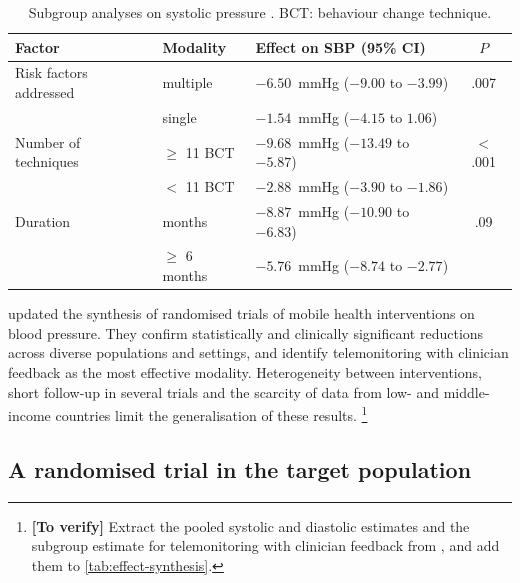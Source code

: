 \documentclass[12pt,a4paper,oneside]{report}
\newcommand{\verify}[1]{\footnote{\textbf{[To verify]} #1}}
\begin{document}
\begin{table}[htbp]
\centering\small
\caption{Subgroup analyses on systolic pressure \parencite{zhou2024}. BCT: behaviour change technique.}\label{tab:subgroups}
\begin{tabularx}{\textwidth}{@{}>{\raggedright\arraybackslash}p{3.3cm} >{\raggedright\arraybackslash}p{2.5cm} X c@{}}
\toprule
\textbf{Factor} & \textbf{Modality} & \textbf{Effect on SBP (95\% CI)} & \textbf{$P$} \\
\midrule
Risk factors addressed & multiple & $-6.50$~mmHg ($-9.00$ to $-3.99$) & .007 \\
                       & single   & $-1.54$~mmHg ($-4.15$ to $1.06$) & \\
\addlinespace
Number of techniques & $\geq$ 11 BCT & $-9.68$~mmHg ($-13.49$ to $-5.87$) & $<$.001 \\
                     & $<$ 11 BCT    & $-2.88$~mmHg ($-3.90$ to $-1.86$) & \\
\addlinespace
Duration & 3 months & $-8.87$~mmHg ($-10.90$ to $-6.83$) & .09 \\
         & $\geq$ 6 months & $-5.76$~mmHg ($-8.74$ to $-2.77$) & \\
\bottomrule
\end{tabularx}
\end{table}

\Textcite{bandeira2024} updated the synthesis of randomised trials of mobile health interventions on blood pressure. They confirm statistically and clinically significant reductions across diverse populations and settings, and identify telemonitoring with clinician feedback as the most effective modality. Heterogeneity between interventions, short follow-up in several trials and the scarcity of data from low- and middle-income countries limit the generalisation of these results.%
\verify{Extract the pooled systolic and diastolic estimates and the subgroup estimate for telemonitoring with clinician feedback from \textcite{bandeira2024}, and add them to \cref{tab:effect-synthesis}.}

\subsection{A randomised trial in the target population}\label{sec:mihevc}\label{sec:mechanism}\label{sec:feasibility}
\end{document}
